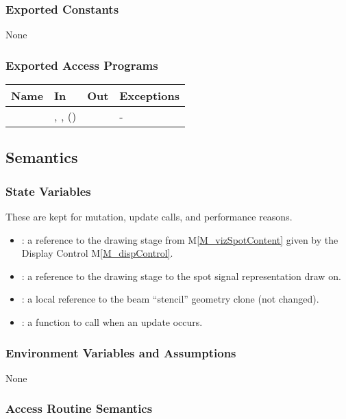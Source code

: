 \documentclass[12pt, titlepage]{article}
\newcommand{\mref}[1]{M\ref{#1}}
\begin{document}
\subsubsection{Exported Constants}
None
\subsubsection{Exported Access Programs}

\begin{center}
\begin{tabular}{L{5cm} L{4cm} L{4cm} L{2cm}}
\hline
\textbf{Name} & \textbf{In} & \textbf{Out} & \textbf{Exceptions} \\
\hline
{} & , ,  ()
  &  & - \\
\hline
\end{tabular}
\end{center}

\subsection{Semantics}

\subsubsection{State Variables}
These are kept for mutation, update calls, and performance reasons.
\begin{itemize}
  \item {}: a reference to the drawing stage from \mref{M_vizSpotContent}
    given by the Display Control \mref{M_dispControl}.
  \item {}: a reference to the drawing stage to the spot signal
    representation draw on.
  \item {}: a local reference to the beam ``stencil'' geometry clone (not changed).
  \item {}: a function to call when an update occurs.
\end{itemize}

\subsubsection{Environment Variables and Assumptions}
None

\subsubsection{Access Routine Semantics}
\end{document}
